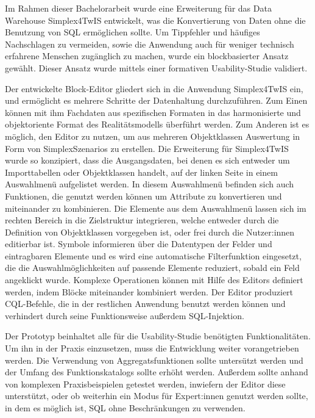 Im Rahmen dieser Bachelorarbeit wurde eine Erweiterung für das Data Warehouse Simplex4TwIS entwickelt, was die Konvertierung von Daten ohne die Benutzung von \acs{SQL} ermöglichen sollte. Um Tippfehler und häufiges Nachschlagen zu vermeiden, sowie die Anwendung auch für weniger technisch erfahrene Menschen zugänglich zu machen, wurde ein blockbasierter Ansatz gewählt. Dieser Ansatz wurde mittels einer formativen Usability-Studie validiert.

\pskip
Der entwickelte Block-Editor gliedert sich in die Anwendung Simplex4TwIS ein, und ermöglicht es mehrere Schritte der Datenhaltung durchzuführen. Zum Einen können mit ihm Fachdaten aus spezifischen Formaten in das harmonisierte und objektoriente Format des Realitätsmodells überführt werden. Zum Anderen ist es möglich, den Editor zu nutzen, um aus mehreren Objektklassen Auswertung in Form von SimplexSzenarios zu erstellen. Die Erweiterung für Simplex4TwIS wurde so konzipiert, dass die Ausgangsdaten, bei denen es sich entweder um Importtabellen oder Objektklassen handelt, auf der linken Seite in einem Auswahlmenü aufgelistet werden. In diesem Auswahlmenü befinden sich auch Funktionen, die genutzt werden können um Attribute zu konvertieren und miteinander zu kombinieren. Die Elemente aus dem Auswahlmenü lassen sich im rechten Bereich in die Zielstruktur integrieren, welche entweder durch die Definition von Objektklassen vorgegeben ist, oder frei durch die Nutzer:innen editierbar ist. Symbole informieren über die Datentypen der Felder und eintragbaren Elemente und es wird eine automatische Filterfunktion eingesetzt, die die Auswahlmöglichkeiten auf passende Elemente reduziert, sobald ein Feld angeklickt wurde. Komplexe Operationen können mit Hilfe des Editors definiert werden, indem Blöcke miteinander kombiniert werden. Der Editor produziert \ac{CQL}-Befehle, die in der restlichen Anwendung benutzt werden können und verhindert durch seine Funktionsweise außerdem \ac{SQL}-Injektion.

Der Prototyp beinhaltet alle für die Usability-Studie benötigten Funktionalitäten. Um ihn in der Praxis einzusetzen, muss die Entwicklung weiter vorangetrieben werden. Die Verwendung von Aggregatsfunktionen sollte untersützt werden und der Umfang des Funktionskatalogs sollte erhöht werden. Außerdem sollte anhand von komplexen Praxisbeispielen getestet werden, inwiefern der Editor diese unterstützt, oder ob weiterhin ein Modus für Expert:innen genutzt werden sollte, in dem es möglich ist, \ac{SQL} ohne Beschränkungen zu verwenden.

